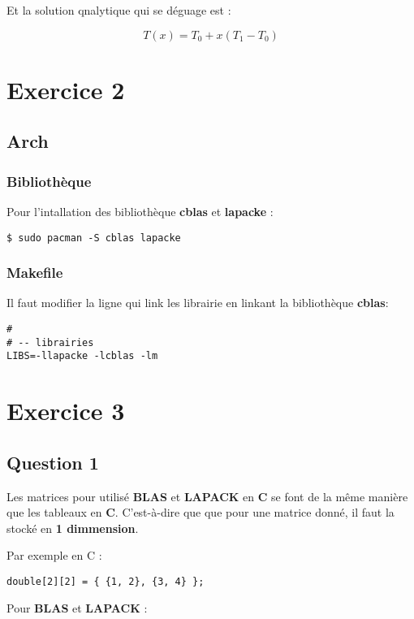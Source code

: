 \documentclass[11pt]{article}
\begin{document}
Et la solution qnalytique qui se déguage est : 

$$ T(x) = T_0 + x (T_1 - T_0) $$

\section{Exercice 2}
\label{sec:org50083dc}
\subsection{Arch}
\label{sec:orgec442c3}
\subsubsection{Bibliothèque}
\label{sec:org7254db5}

Pour l'intallation des bibliothèque \textbf{cblas} et \textbf{lapacke} :
\begin{verbatim}
$ sudo pacman -S cblas lapacke
\end{verbatim}

\subsubsection{Makefile}
\label{sec:org71efc17}

Il faut modifier la ligne qui link les librairie en linkant la
bibliothèque \textbf{cblas}:

\begin{verbatim}
#
# -- librairies
LIBS=-llapacke -lcblas -lm
\end{verbatim}

\section{Exercice 3}
\label{sec:org2a3f00e}
\subsection{Question 1}
\label{sec:org466d901}

Les matrices pour utilisé \textbf{BLAS} et \textbf{LAPACK} en \textbf{C} se font de la
même manière que les tableaux en \textbf{C}. C'est-à-dire que que pour une
matrice donné, il faut la stocké en \textbf{1 dimmension}.

Par exemple en C :
\begin{verbatim}
double[2][2] = { {1, 2}, {3, 4} };
\end{verbatim}

Pour \textbf{BLAS} et \textbf{LAPACK} :
\end{document}
